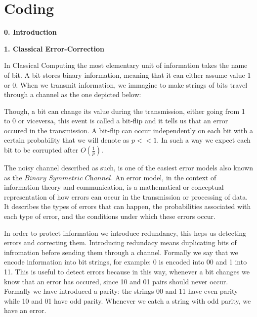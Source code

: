 \documentclass[12pt]{report}
\begin{document}
	
	\begin{minipage}{1 \textwidth}	
	\end{minipage}
	

















 
	\chapter{Coding}
	\begin{minipage}{1 \textwidth}
		
		\textbf{0. Introduction}\newline
		
		\textbf{1. Classical Error-Correction}\newline
		
		In Classical Computing the most elementary unit of information takes the name of bit. A bit stores binary information, meaning that it can either assume value 1 or 0. When we transmit information, we immagine to make strings of bits travel through a channel as the one depicted below: \newline
		
		
		
		Though, a bit can change its value during the transmission, either going from 1 to 0 or viceversa, this event is called a bit-flip and it tells us that an error occured in the transmission. A bit-flip can occur independently on each bit with a certain probability that we will denote as $p << 1$. In such a way we expect each bit to be corrupted after $O(\frac{1}{p})$. \newline
		
		The noisy channel described as such, is one of the easiest error models also known as the $\textit{Binary Symmetric Channel}$. An error model, in the context of information theory and communication, is a mathematical or conceptual representation of how errors can occur in the transmission or processing of data. It describes the types of errors that can happen, the probabilities associated with each type of error, and the conditions under which these errors occur. \newline
		
		In order to protect information we introduce redundancy, this heps us detecting errors and correcting them. 
		Introducing redundacy means duplicating bits of infromation before sending them through a channel. Formally we say that we encode information into bit strings, for example: 0 is encoded into 00 and 1 into 11. This is useful to detect errors because in this way, whenever a bit changes we know that an error has occured, since 10 and 01 pairs should never occur. Formally we have introduced a parity: the strings 00 and 11 have even parity while 10 and 01 have odd parity. Whenever we catch a string with odd parity, we have an error.		\newline
		

\end{minipage}
\end{document}
